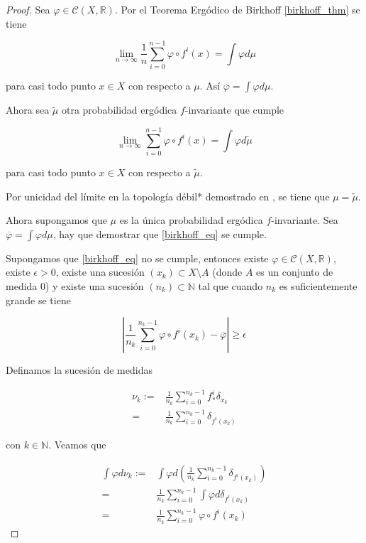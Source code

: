 \begin{proof}
	Sea $\varphi \in \mathcal{C}(X, \mathbb{R})$. Por el Teorema Ergódico de Birkhoff \ref{birkhoff_thm} se tiene
	
	\begin{equation}
		\lim_{n \rightarrow \infty} \frac{1}{n} \sum_{i=0}^{n-1} \varphi \circ f^i(x) = \int \varphi d\mu
	\end{equation}
	
	para casi todo punto $x \in X$ con respecto a $\mu$. Así $\overline{\varphi}=\int \varphi d\mu$.
	
	Ahora sea $\tilde{\mu}$ otra probabilidad ergódica $f$-invariante que cumple
	
	\begin{equation}
		\lim_{n \rightarrow \infty} \sum_{i=0}^{n-1} \varphi \circ f^i(x)=\int \varphi d\tilde{\mu}
	\end{equation}
	
	para casi todo punto $x \in X$ con respecto a $\tilde{\mu}$. 
	
	Por unicidad del límite en la topología débil* demostrado en \cite{heil}, se tiene que $\mu = \tilde{\mu}$.
	
	Ahora supongamos que $\mu$ es la única probabilidad ergódica $f$-invariante. Sea $\overline{\varphi}=\int \varphi d\mu$, hay que demostrar que \eqref{birkhoff_eq} se cumple.
	
	Supongamos que \eqref{birkhoff_eq} no se cumple, entonces existe $\varphi \in \mathcal{C}(X,\mathbb{R})$, existe $\epsilon>0$, existe una sucesión $(x_k) \subset X \setminus A$ (donde $A$ es un conjunto de medida 0) y existe una sucesión $(n_k) \subset \mathbb{N}$ tal que cuando $n_k $ es suficientemente grande se tiene
	
	\begin{equation}
		\left| \frac{1}{n_k} \sum_{i=0}^{n_k-1} \varphi \circ f^i(x_k) - \overline{\varphi} \right| \geq \epsilon \label{negacion_de_eq_birkhoff}
	\end{equation}
	
	Definamos la sucesión de medidas
	
	\begin{align}
		\nu_k := & \frac{1}{n_k} \sum_{i=0}^{n_k-1} f_*^i \delta_{x_k}\\
		=& \frac{1}{n_k} \sum_{i=0}^{n_k-1} \delta_{f^i(x_k)}
	\end{align}
	
	con $k \in \mathbb{N}$. Veamos que
	
	\begin{align}
		\int \varphi d\nu_k := & \int \varphi d\left( \frac{1}{n_k} \sum_{i=0}^{n_k-1} \delta_{f^i(x_k)} \right)\\
		=& \frac{1}{n_k} \sum_{i=0}^{n_k-1} \int \varphi d\delta_{f^i(x_k)}\\
		=& \frac{1}{n_k} \sum_{i=0}^{n_k-1} \varphi \circ f^i(x_k) \label{int_varphi_dnu_k}
	\end{align}
	

\end{proof}
